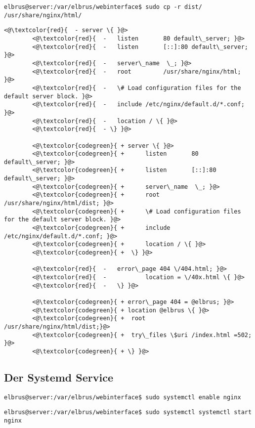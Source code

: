 	\lstset{style=commands}
	\begin{lstlisting}[caption={Kopieren des kompilierten Webinterfaces in der Ordner des Webservers.}]
		elbrus@server:/var/elbrus/webinterface$ sudo cp -r dist/ /usr/share/nginx/html/
	\end{lstlisting}

	\lstset{style=files}
	\begin{lstlisting}[caption={/etc/nginx/nginx.conf - Ändern der folgenden Zeilen.}, numbers=none, keepspaces=true]
		<@\textcolor{red}{	- server \{ }@>
		<@\textcolor{red}{	- 	listen       80 default\_server; }@>
		<@\textcolor{red}{	-	listen       [::]:80 default\_server; }@>
		<@\textcolor{red}{	-	server\_name  \_; }@>
		<@\textcolor{red}{	-	root         /usr/share/nginx/html; }@>
		<@\textcolor{red}{	-	\# Load configuration files for the default server block. }@>
		<@\textcolor{red}{	-	include /etc/nginx/default.d/*.conf; }@>
		<@\textcolor{red}{	-	location / \{ }@>
		<@\textcolor{red}{	- \} }@>
		
		<@\textcolor{codegreen}{ + server \{ }@>
		<@\textcolor{codegreen}{ +		listen       80 default\_server; }@>
		<@\textcolor{codegreen}{ +		listen       [::]:80 default\_server; }@>
		<@\textcolor{codegreen}{ +		server\_name  \_; }@>
		<@\textcolor{codegreen}{ +		root         /usr/share/nginx/html/dist; }@>
		<@\textcolor{codegreen}{ +		\# Load configuration files for the default server block. }@>
		<@\textcolor{codegreen}{ +		include /etc/nginx/default.d/*.conf; }@>
		<@\textcolor{codegreen}{ +		location / \{ }@>
		<@\textcolor{codegreen}{ +	\} }@>
		
		<@\textcolor{red}{	-	error\_page 404 \/404.html; }@>
		<@\textcolor{red}{	-			location = \/40x.html \{ }@>
		<@\textcolor{red}{	-	\} }@>
		
		<@\textcolor{codegreen}{ + error\_page 404 = @elbrus; }@>
		<@\textcolor{codegreen}{ + location @elbrus \{ }@>
		<@\textcolor{codegreen}{ +	root  /usr/share/nginx/html/dist;}@>
		<@\textcolor{codegreen}{ +	try\_files \$uri /index.html =502; }@>
		<@\textcolor{codegreen}{ + \} }@>
	\end{lstlisting}
	\newpage

	\subsection[systemd service]{Der Systemd Service}
	
	\lstset{style=commands}
	\begin{lstlisting}[caption={Aktivieren des Webservers.}]
		elbrus@server:/var/elbrus/webinterface$ sudo systemctl enable nginx
	\end{lstlisting}
	
	\lstset{style=commands}
	\begin{lstlisting}[caption={Starten des Webservers.}]
		elbrus@server:/var/elbrus/webinterface$ sudo systemctl systemctl start nginx 
	\end{lstlisting}